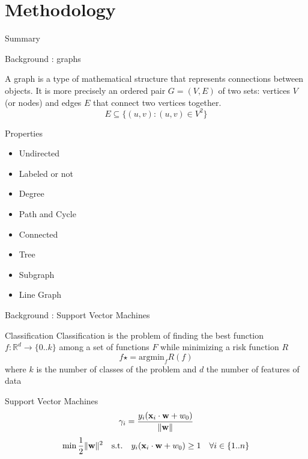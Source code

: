 \documentclass[compress]{beamer}
\DeclarePairedDelimiter{\norm}{\lVert}{\rVert}
\let\vec\mathbf
\newcommand*{\R}{%
  \mathbb{R}%
}
\begin{document}
\section{Methodology}
\begin{frame}{Summary}
  \tableofcontents[currentsection]
\end{frame}
\begin{frame}{Background : graphs}
\begin{definition}
	A graph\cite{bondy1976graph} is a type of mathematical structure that represents connections between objects. It is more precisely an ordered pair $G=(V,E)$ of two sets: vertices $V$ (or nodes) and edges $E$ that connect two vertices together.
	\begin{equation*}
	E \subseteq \{(u,v) : (u,v) \in V^2\}
	\end{equation*}
\end{definition}
\begin{block}{Properties}
	\begin{multicols}{2}
		\begin{itemize}
			\item Undirected
			\item Labeled or not
			\item Degree
			\item Path and Cycle
		\end{itemize}
		\begin{itemize}
			\item Connected
			\item Tree
			\item Subgraph
			\item Line Graph
		\end{itemize}
	\end{multicols}
\end{block}
\end{frame}
\begin{frame}{Background : Support Vector Machines}
	\begin{block}{Classification}
		Classification is the problem of finding the best function $f :  \R^d \longrightarrow \{0..k\}$ among a set of functions $F$ while minimizing a risk function $R$
		\begin{equation*}
		f\star = \mbox{argmin}_f R(f)
		\end{equation*}
		where $k$ is the number of classes of the problem and $d$ the number of features of data 
	\end{block}
	\begin{block}{Support Vector Machines}
		\begin{equation*}
			\gamma_i = \frac{y_{i}(\vec{x}_{i} \cdot \vec{w} + w_{0})}{\norm{\vec{w}}}
		\end{equation*}
		\begin{equation*}
			\min \frac{1}{2}\norm{\vec{w}}^{2} \quad
			\textup{s.t.}\quad y_{i}(\vec{x}_{i} \cdot \vec{w} + w_{0}) \geq 1 \quad \forall i \in \{1..n\}
		\end{equation*}
	\end{block}
\end{frame}
\end{document}
